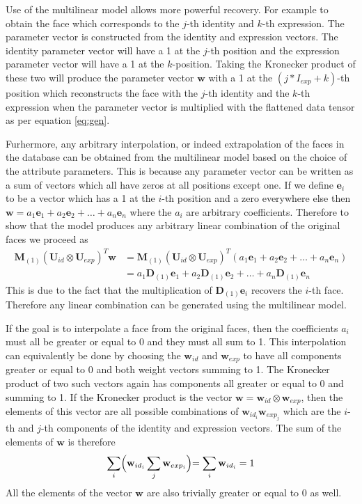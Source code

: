 \documentclass[11pt,a4paper]{report}
\begin{document}
Use of the multilinear model allows more powerful recovery. For
example to obtain the face which corresponds to the $j$-th identity
and $k$-th expression. The parameter vector is constructed from the identity and
expression vectors. The identity parameter vector will have a 1 at the $j$-th
position and the expression parameter vector will have a 1 at the
$k$-position. Taking the Kronecker product of these two will produce the
parameter vector $\mathbf{w}$ with a 1 at the $(j*I_{exp} + k)$-th position which
reconstructs the face with the $j$-th identity and the $k$-th expression when
the parameter vector is multiplied with the flattened data tensor as per
equation \ref{eq:gen}.

Furhermore, any arbitrary interpolation, or indeed extrapolation of the faces in
the database can be obtained from the multilinear model based on the choice of
the attribute parameters. This is because any parameter vector can
be written as a sum of vectors which all have zeros at all positions except
one. If we define $\mathbf{e}_i$ to be a vector which has a 1 at the $i$-th position and
a zero everywhere else then $\mathbf{w} = a_1\mathbf{e}_1 + a_2\mathbf{e}_2 +
\ldots + a_n\mathbf{e}_n$ where the $a_i$ are arbitrary coefficients. Therefore to show that the model produces any
arbitrary linear combination of the original faces we proceed as
\begin{align} 
\mathbf{M}_{(1)}(\mathbf{U}_{id} \otimes \mathbf{U}_{exp})^T\mathbf{w} &=
\mathbf{M}_{(1)}(\mathbf{U}_{id} \otimes \mathbf{U}_{exp})^T(a_1\mathbf{e}_1 +
a_2\mathbf{e}_2 + \ldots + a_n\mathbf{e}_n)\\
&=a_1\mathbf{D}_{(1)}\mathbf{e}_1 +
a_2\mathbf{D}_{(1)}\mathbf{e}_2 + \ldots + a_n\mathbf{D}_{(1)}\mathbf{e}_n
\end{align}
This is due to the fact that the multiplication of $\mathbf{D}_{(1)}\mathbf{e}_i$ recovers the
$i$-th face. Therefore any linear combination can be generated using the
multilinear model. 

If the goal is to interpolate a face from the original faces, then the
coefficients $a_i$ must all be greater or equal to 0 and they must all sum to
1. This interpolation can equivalently be done by choosing the $\mathbf{w}_{id}$
and $\mathbf{w}_{exp}$ to have all components greater or equal to 0 and both
weight vectors summing to 1. The Kronecker product of two such vectors again has
components all greater or equal to 0 and summing to 1. If the Kronecker product
is the vector $\mathbf{w} = \mathbf{w}_{id} \otimes \mathbf{w}_{exp}$, then the
elements of this vector are all possible combinations of
$\mathbf{w}_{id_i}\mathbf{w}_{exp_j}$ which are the $i$-th and $j$-th components
of the identity and expression vectors. The sum of the elements of $\mathbf{w}$ is therefore
\begin{equation*}
\sum_i \Bigr(\mathbf{w}_{id_i} \sum_j \mathbf{w}_{exp_i} \Bigl) = \sum_i
\mathbf{w}_{id_i} = 1
\end{equation*}
All the elements of the vector $\mathbf{w}$ are also trivially greater or equal to 0
as well.
\end{document}
